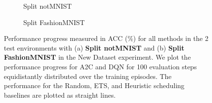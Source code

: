 \begin{figure}[t]
	\centering
	\setlength{\figwidth}{0.26\textwidth}
	\setlength{\figheight}{.14\textheight}
	\begin{subfigure}[t]{0.48\textwidth}
		\centering
		
		\vspace{-4mm} %
		\caption{Split notMNIST}
		\label{fig:rewards_notmnist_2envs}
	\end{subfigure}%
	\begin{subfigure}[t]{0.48\textwidth}
		\centering
		
		\caption{Split FashionMNIST}
		\label{fig:rewards_fashionmnist_2envs}
	\end{subfigure}
	\vspace{-1mm}
	\caption{Performance progress measured in ACC (\%) for all methods in the 2 test environments with (a) {\bf Split notMNIST} and (b) {\bf Split FashionMNIST} in the New Dataset experiment. We plot the performance progress for A2C and DQN for 100 evaluation steps equidistantly distributed over the training episodes. The performance for the Random, ETS, and Heuristic scheduling baselines are plotted as straight lines.  }
	\label{fig:rewards_new_dataset_2envs}
	\vspace{-2mm}
\end{figure}

